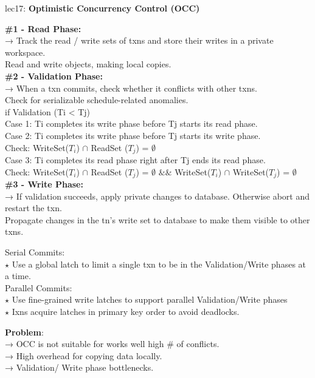 \documentclass[letterpaper,11pt]{exam}
\begin{document}
\vspace*{0cm}
lec17: \textbf{Optimistic Concurrency Control (OCC)} \\ 
\begin{adjustwidth}{2em}{0pt}
  \begin{spacing}{1.2}
  \textbf{\#1 - Read Phase:} \\
  → Track the read / write sets of txns and store their writes in a private workspace. \\
  Read and write objects, making local copies. \\

  \textbf{\#2 - Validation Phase:} \\
  → When a txn commits, check whether it conflicts with other txns. \\
  Check for serializable schedule-related anomalies. \\
  
  if Validation (Ti < Tj) \\
  Case 1: Ti completes its write phase before Tj starts its read phase. \\  
  Case 2: Ti completes its write phase before Tj starts its write phase. \\
  \hspace*{1em}Check: WriteSet($T_i$) $\cap$ ReadSet ($T_j$) = $\emptyset$ \\
  Case 3: Ti completes its read phase right after Tj ends its read phase. \\
  \hspace*{1em}Check: WriteSet($T_i$) $\cap$ ReadSet ($T_j$) = $\emptyset$ $\&\&$ WriteSet($T_i$) $\cap$ WriteSet($T_j$) = $\emptyset$ \\

  \textbf{\#3 - Write Phase:} \\
  → If validation succeeds, apply private changes to database. Otherwise abort and restart the txn. \\
  Propagate changes in the tn's write set to database to make them visible to other txns. \\
  \begin{adjustwidth}{1em}{0pt}
  Serial Commits: \\
  $\star$ Use a global latch to limit a single txn to be in the Validation/Write phases at a time. \\
  
  Parallel Commits: \\
  $\star$ Use fine-grained write latches to support parallel Validation/Write phases \\
  $\star$ Ixns acquire latches in primary key order to avoid deadlocks. \\
  \end{adjustwidth}

  \textbf{Problem}: \\
  → OCC is not suitable for works well high \# of conflicts. \\
  → High overhead for copying data locally. \\
  → Validation/ Write phase bottlenecks. \\
  \end{spacing}
\end{adjustwidth}
\end{document}
